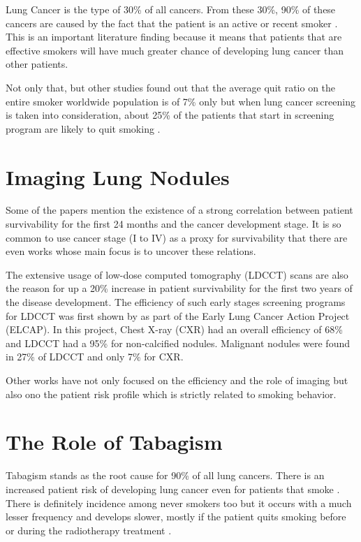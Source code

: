 Lung Cancer is the type of 30\% of all cancers. From these 30\%, 90\% of these cancers are  caused by the fact that the patient is an active or recent smoker \cite{jaklitsch2012, nccn2019, roberts2013}. This is an important literature finding because it means that patients that are effective smokers will have much greater chance of developing lung cancer than other patients.

Not only that, but other studies found out that the average quit ratio on the entire smoker worldwide population is of 7\% only but when lung  cancer screening is taken into consideration, about 25\% of the patients that start in screening program are likely to quit smoking \cite{fox2003, aalst2010}. %

\section{Imaging Lung Nodules}

Some of the papers mention the existence of a strong correlation between patient survivability for the first 24 months and the cancer development stage. It is so common to use cancer stage (I to IV) as a proxy for survivability that there are even works whose main focus is to uncover these relations\cite{roberts2013, fox2003}.

The extensive usage of low-dose computed tomography (LDCCT) scans are also the reason for up a 20\% increase in patient survivability for the first two years of the disease development\cite{fox2003, macredmond2006, mountain2008, jaklitsch2012}. The efficiency of such early stages screening programs for LDCCT was first shown by  as part of the Early Lung Cancer Action  Project (ELCAP). In this project, Chest X-ray (CXR) had an overall efficiency of 68\% and LDCCT had a 95\% for non-calcified nodules. Malignant nodules were found in 27\% of LDCCT and only 7\% for CXR. 

Other works have not only focused on the efficiency and the role of imaging but also ono the patient risk profile which is strictly related to smoking behavior.

\section{The Role of Tabagism}

Tabagism stands as the root cause for 90\% of all lung cancers. There is an increased patient risk of developing lung cancer even for patients that smoke \cite{ostroff2001, aalst2010, aalst2011}. There is definitely incidence among never smokers too but it occurs with a much lesser frequency and develops slower, mostly if the patient quits smoking before or during the radiotherapy treatment \cite{fox2003, rivera2016}.

